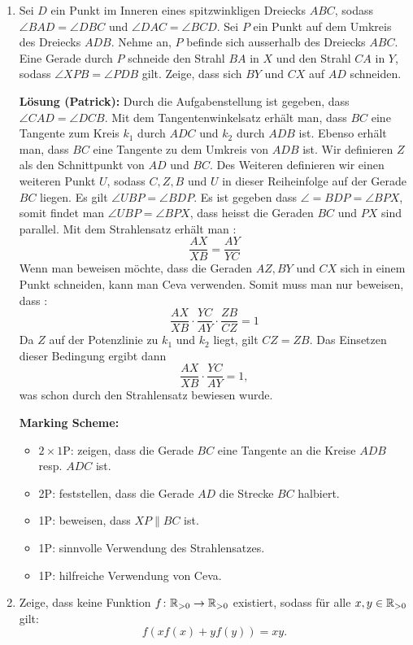 \documentclass[language=german,style=solution]{smo}
\begin{document}
\begin{enumerate}[label=\textbf{\arabic*.}]
\item Sei $D$ ein Punkt im Inneren eines spitzwinkligen Dreiecks $ABC$, sodass $\angle BAD= \angle DBC$ und $\angle DAC=\angle BCD$. Sei $P$ ein Punkt auf dem Umkreis des Dreiecks $ADB$. Nehme an, $P$ befinde sich ausserhalb des Dreiecks $ABC$. Eine Gerade durch $P$ schneide den Strahl $BA$ in $X$ und den Strahl $CA$ in $Y$, sodass $\angle XPB=\angle PDB$ gilt. Zeige, dass sich $BY$ und $CX$ auf $AD$ schneiden.

\textbf{Lösung (Patrick):}
Durch die Aufgabenstellung ist gegeben, dass $\angle CAD = \angle DCB$. Mit dem Tangentenwinkelsatz erhält man, dass $BC$ eine Tangente zum Kreis $k_1$ durch $ADC$ und $k_2$ durch $ADB$ ist. Ebenso erhält man, dass $BC$ eine Tangente zu dem Umkreis von $ADB$ ist. Wir definieren $Z$ als den Schnittpunkt von $AD$ und $BC$. Des Weiteren definieren wir einen weiteren Punkt $U$, sodass $C,Z,B$ und $U$ in dieser Reiheinfolge auf der Gerade $BC$ liegen. Es gilt $\angle UBP = \angle BDP$. Es ist gegeben dass $\angle = BDP = \angle BPX$, somit findet man $\angle UBP = \angle BPX$, dass heisst die Geraden $BC$ und $PX$ sind parallel.
Mit dem Strahlensatz erhält man : $$\frac{AX}{XB}= \frac{AY}{YC}$$
Wenn man beweisen möchte, dass die Geraden $AZ, BY$ und $CX$ sich in einem Punkt schneiden, kann man Ceva verwenden. Somit muss man nur beweisen, dass : $$\frac{AX}{XB}\cdot\frac{YC}{AY}\cdot\frac{ZB}{CZ}=1$$
Da $Z$ auf der Potenzlinie zu $k_1$ und $k_2$ liegt, gilt $CZ = ZB$.
Das Einsetzen dieser Bedingung ergibt dann $$\frac{AX}{XB}\cdot\frac{YC}{AY}=1,$$
was schon durch den Strahlensatz bewiesen wurde.

	
\textbf{Marking Scheme:}
\begin{itemize}
\item $2 \times 1$P: zeigen, dass die Gerade $BC$ eine Tangente an die Kreise $ADB$ resp. $ADC$ ist.
\item 2P: feststellen, dass die Gerade $AD$ die Strecke $BC$ halbiert.
\item 1P: beweisen, dass $XP\parallel BC$ ist.
\item 1P: sinnvolle Verwendung des Strahlensatzes.
\item 1P: hilfreiche Verwendung von Ceva.
\end{itemize}

\newpage

\item Zeige, dass keine Funktion $f\colon \mathbb{R}_{>0} \to \mathbb{R}_{>0}$ existiert, sodass für alle $x,y\in\mathbb{R}_{>0}$ gilt:
\[
f(xf(x)+yf(y))=xy.
\]


\end{enumerate}
\end{document}
